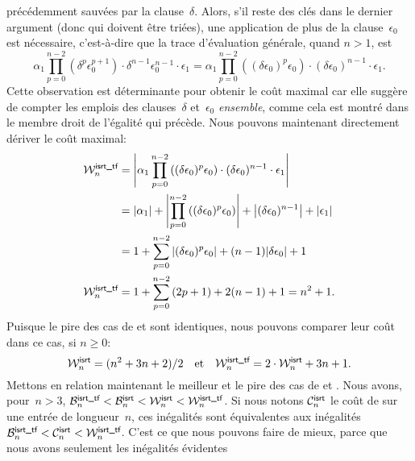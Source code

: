 précédemment sauvées par la clause~\(\delta\). Alors, s'il reste des
clés dans le dernier argument (donc qui doivent être triées), une
application de plus de la clause~\(\epsilon_0\) est nécessaire,
c'est-à-dire que la trace d'évaluation générale, quand \(n > 1\), est
\begin{equation*}
\alpha_1\prod_{p=0}^{n-2}{\left(\delta^p\epsilon_0^{p+1}\right)} \cdot
\delta^{n-1}\epsilon_0^{n-1} \cdot \epsilon_1
= \alpha_1\prod_{p=0}^{n-2}{\left((\delta\epsilon_0)^p\epsilon_0\right)}
\cdot (\delta\epsilon_0)^{n-1} \cdot \epsilon_1.
\end{equation*}
Cette observation est déterminante pour obtenir le coût maximal car
elle suggère de compter les emplois des clauses~\(\delta\)
et~\(\epsilon_0\) \emph{ensemble}, comme cela est montré dans le
membre droit de l'égalité qui précède. Nous pouvons maintenant
directement dériver le coût maximal:
\begin{align*}
  \W{\fun{isrt\_tf}}{n}
  &= \left|\alpha_1\prod_{p=0}^{n-2}{\left((\delta\epsilon_0)^p\epsilon_0\right)}
     \cdot (\delta\epsilon_0)^{n-1} \cdot \epsilon_1\right|\\
  &= \len{\alpha_1} +
     \left|\prod_{p=0}^{n-2}{\left((\delta\epsilon_0)^p\epsilon_0\right)}\right|
     + \left|(\delta\epsilon_0)^{n-1}\right| + \len{\epsilon_1}\\
  &= 1 + \sum_{p=0}^{n-2}{\left|(\delta\epsilon_0)^p\epsilon_0\right|}
     + (n-1)\len{\delta\epsilon_0} + 1\\
\W{\fun{isrt\_tf}}{n}
  &= 1 + \sum_{p=0}^{n-2}{(2p+1)} + 2(n-1) + 1 = n^2 + 1.
\end{align*}
Puisque le pire des cas de  et 
sont identiques, nous pouvons comparer leur coût dans ce cas, si
\(n\geqslant{}0\):
\begin{equation*}
\W{\fun{isrt}}{n}     = (n^2 + 3n + 2)/2
\quad\text{et}\quad
\W{\fun{isrt\_tf}}{n} = 2 \cdot \W{\fun{isrt}}{n}  + 3n + 1.
\end{equation*}
Mettons en relation maintenant le meilleur et le pire des cas de
 et . Nous avons, pour~\(n>3\),
\(\B{\smash[t]{\fun{isrt\_tf}}}{n} < \B{\fun{isrt}}{n} <
\W{\fun{isrt}}{n} < \W{\smash[t]{\fun{isrt\_tf}}}{n}\). Si nous notons
\(\C{\fun{isrt}}{n}\) le coût de  sur une entrée de
longueur~\(n\), ces inégalités sont équivalentes aux inégalités \(
\B{\smash[t]{\fun{isrt\_tf}}}{n} < \C{\fun{isrt}}{n} <
\W{\smash[t]{\fun{isrt\_tf}}}{n}\).  C'est ce que nous pouvons faire
de mieux, parce que nous avons seulement les inégalités évidentes
